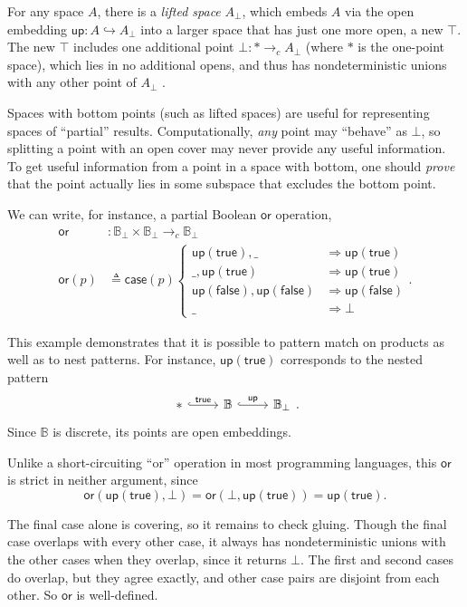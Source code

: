 \documentclass[conference]{IEEEtran}
\newcommand{\hookto}{\hookrightarrow}
\newcommand{\cto}{\to_c}
\newcommand{\One}{\ast}
\newcommand{\bool}{\mathbb{B}}
\newcommand{\wildcard}{\_}
\newcommand{\Branch}{\Rightarrow}
\newcommand{\up}{\mathsf{up}}
\newcommand{\btrue}{\mathsf{true}}
\newcommand{\bfalse}{\mathsf{false}}
\begin{document}
For any space $A$, there is a \emph{lifted space} $A_\bot$, which embeds $A$ via the open embedding $\up : A \hookto A_\bot$ into a larger space that has just one more open, a new $\top$. The new $\top$ includes one additional point $\bot : \One \cto A_\bot$ (where $\One$ is the one-point space), which lies in no additional opens, and thus has nondeterministic unions with any other point of $A_\bot$ \cite{topologyvialogic}.

Spaces with bottom points (such as lifted spaces) are useful for representing spaces of ``partial'' results. Computationally, \emph{any} point may ``behave'' as $\bot$, so splitting a point with an open cover may never provide any useful information. To get useful information from a point in a space with bottom, one should \emph{prove} that the point actually lies in some subspace that excludes the bottom point.

We can write, for instance, a partial Boolean $\mathsf{or}$ operation,
\begin{align*}
\mathsf{or} &: \bool_\bot \times \bool_\bot \cto \bool_\bot
\\ \mathsf{or}(p) &\triangleq \mathsf{case}(p)
\begin{cases}
\up(\btrue), \wildcard &\Branch \up(\btrue)
\\ \wildcard, \up(\btrue) &\Branch \up(\btrue)
\\ \up(\bfalse), \up(\bfalse) &\Branch \up(\bfalse)
\\ \wildcard &\Branch \bot
\end{cases}.
\end{align*}

This example demonstrates that it is possible to pattern match on products as well as to nest patterns. For instance, $\mathsf{up}(\mathsf{true})$ corresponds to the nested pattern
\begin{equation*}
\begin{tikzcd}
\One \arrow[r, hook, "\mathsf{true}"]
& \bool
   \arrow[r, hook, "\mathsf{up}"]
& \bool_\bot
\end{tikzcd}.
\end{equation*}
Since $\bool$ is discrete, its points are open embeddings.

Unlike a short-circuiting ``or'' operation in most programming languages, this $\mathsf{or}$ is strict in neither argument, since
\[ 
\mathsf{or}(\mathsf{up}(\mathsf{true}), \bot) = 
\mathsf{or}(\bot, \mathsf{up}(\mathsf{true})) =
\mathsf{up}(\mathsf{true}).
\]

The final case alone is covering, so it remains to check gluing. Though the final case overlaps with every other case, it always has nondeterministic unions with the other cases when they overlap, since it returns $\bot$. The first and second cases do overlap, but they agree exactly, and other case pairs are disjoint from each other. So $\mathsf{or}$ is well-defined.
\end{document}
